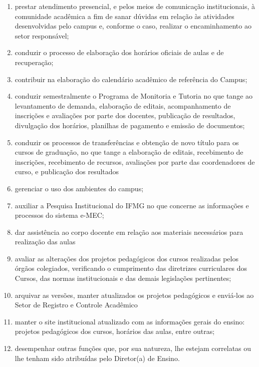 \documentclass[a4paper,12pt]{report}
\begin{document}
\begin{enumerate}
\renewcommand{\labelenumi}{\Roman{enumi}}

\item prestar atendimento presencial, e pelos meios de comunicação institucionais, à  
      comunidade acadêmica a fim de sanar dúvidas em relação às atividades desenvolvidas 
      pelo campus e, conforme o caso, realizar o encaminhamento ao setor responsável;

\item conduzir o processo de elaboração dos horários oficiais de aulas e de recuperação;

\item contribuir na elaboração do calendário acadêmico de referência do Campus;

\item conduzir semestralmente o Programa de Monitoria e Tutoria no que tange ao 
      levantamento de demanda, elaboração de editais, acompanhamento de inscrições e 
      avaliações por parte dos docentes, publicação de resultados, divulgação dos 
      horários, planilhas de pagamento e emissão de documentos;
      
\item conduzir os processos de transferências e obtenção de novo título para os cursos de           
      graduação, no que tange a elaboração de editais, recebimento de inscrições,  
      recebimento de recursos, avaliações por parte das coordenadores de curso, e 
      publicação dos resultados

\item gerenciar o uso dos ambientes do campus;

\item auxiliar a Pesquisa Institucional do IFMG no que concerne as informações e processos 
      do sistema e-MEC;

\item dar assistência ao corpo docente em relação aos materiais necessários para realização 
      das aulas

\item avaliar as alterações dos projetos pedagógicos dos cursos realizadas pelos órgãos          colegiados, verificando o cumprimento das diretrizes curriculares dos Cursos, das 
      normas institucionais e das demais legislações pertinentes;

\item arquivar as versões, manter atualizados os projetos pedagógicos e enviá-los ao Setor 
      de Registro e Controle Acadêmico

\item manter o site institucional atualizado com as informações gerais do ensino: projetos 
      pedagógicos dos cursos, horários das aulas, entre outras;

\item desempenhar outras funções que, por sua natureza, lhe estejam correlatas ou lhe  
      tenham sido atribuídas pelo Diretor(a) de Ensino.
\end{enumerate}
\end{document}
